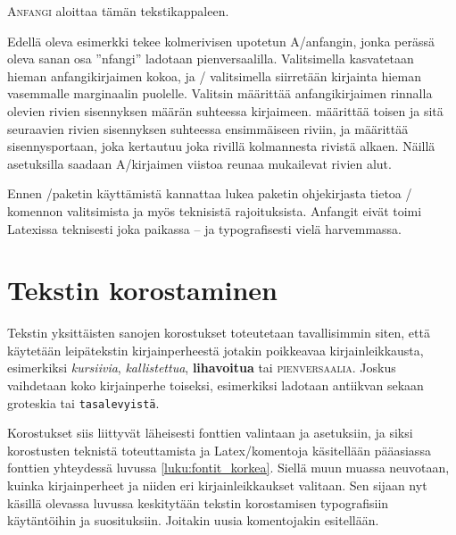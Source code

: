 \begin{koodilohkosis}
  \lettrine[lines=3, loversize=.06, lhang=.02, findent=-5bp,
  nindent=4bp, slope=4bp]{A}{nfangi} aloittaa tämän tekstikappaleen.
\end{koodilohkosis}

Edellä oleva esimerkki tekee kolmerivisen upotetun A\-/anfangin, jonka
perässä oleva sanan osa ''nfangi'' ladotaan pienversaalilla.
Valitsimella  kasvatetaan hieman anfangikirjaimen
kokoa, ja \-/ valitsimella siirretään kirjainta hieman
vasemmalle marginaalin puolelle. Valitsin  määrittää
anfangikirjaimen rinnalla olevien rivien sisennyksen määrän suhteessa
kirjaimeen.  määrittää toisen ja sitä seuraavien rivien
sisennyksen suhteessa ensimmäiseen riviin, ja  määrittää
sisennysportaan, joka kertautuu joka rivillä kolmannesta rivistä alkaen.
Näillä asetuksilla saadaan A\-/kirjaimen viistoa reunaa mukailevat
rivien alut.

Ennen \-/paketin käyttämistä kannattaa lukea paketin
ohjekirjasta tietoa \-/ komennon valitsimista ja myös
teknisistä rajoituksista. Anfangit eivät toimi Latexissa teknisesti joka
paikassa -- ja typografisesti vielä harvemmassa.

\section{Tekstin korostaminen}
\label{luku:korostus}

Tekstin yksittäisten sanojen korostukset toteutetaan tavallisimmin
siten, että käytetään leipätekstin kirjainperheestä jotakin poikkeavaa
kirjainleikkausta, esimerkiksi \textit{kursiivia},
\textsl{kallistettua}, \textbf{lihavoitua} tai \textsc{pienversaalia}.
Joskus vaihdetaan koko kirjainperhe toiseksi, esimerkiksi ladotaan
\textrm{antiikvan} sekaan \textsf{groteskia} tai \texttt{tasalevyistä}.

Korostukset siis liittyvät läheisesti fonttien valintaan ja asetuksiin,
ja siksi korostusten teknistä toteuttamista ja Latex\-/komentoja
käsitellään pääasiassa fonttien yhteydessä luvussa
\ref{luku:fontit_korkea}.  Siellä muun muassa neuvotaan,
kuinka kirjainperheet ja niiden eri kirjainleikkaukset valitaan. Sen
sijaan nyt käsillä olevassa luvussa keskitytään tekstin korostamisen
typografisiin käytäntöihin ja suosituksiin. Joitakin uusia komentojakin
esitellään.

